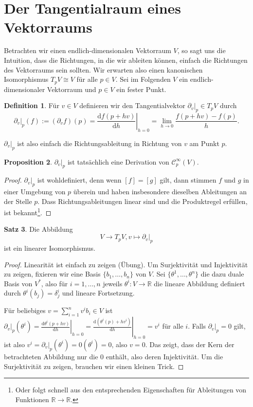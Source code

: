 \documentclass[a4paper]{scrreprt}
\numberwithin{equation}{chapter}
\newcommand{\D}{\mathrm{d}}
\newcommand{\sC}{\mathcal{C}^{\infty}}
\theoremstyle{definition}
\newtheorem{defn}{Definition}[section]
\newtheorem{prop}[defn]{Proposition}
\newtheorem{satz}[defn]{Satz}
\begin{document}
\section{Der Tangentialraum eines Vektorraums}

Betrachten wir einen endlich-dimensionalen Vektorraum $V$, so sagt uns die Intuition, dass die Richtungen, in die wir ableiten können, einfach die Richtungen des Vektorraums sein sollten. Wir erwarten also einen kanonischen Isomorphismus $T_pV \cong V$ für alle $p \in V$. Sei im Folgenden $V$ ein endlich-dimensionaler Vektorraum und $p \in V$ ein fester Punkt.
\begin{defn}
	Für $v \in V$ definieren wir den Tangentialvektor $\left.\partial_v\right|_p \in T_pV$ durch
	\[\left.\partial_v\right|_p(f) := (\partial_v f)(p) = \left.\frac{\D f(p + h v)}{\D h}\right|_{h=0} = \lim_{h\to 0} \frac{f(p + h v) - f(p)}{h}.\]
\end{defn}
$\left.\partial_v\right|_p$ ist also einfach die Richtungsableitung in Richtung von $v$ am Punkt $p$.
\begin{prop}
	$\left.\partial_v\right|_p$ ist tatsächlich eine Derivation von $\sC_p(V)$.
	
	\begin{proof}
		$\left.\partial_v\right|_p$ ist wohldefiniert, denn wenn $[f] = [g]$ gilt, dann stimmen $f$ und $g$ in einer Umgebung von $p$ überein und haben insbesondere dieselben Ableitungen an der Stelle $p$. Dass Richtungsableitungen linear sind und die Produktregel erfüllen, ist bekannt\footnote{Oder folgt schnell aus den entsprechenden Eigenschaften für Ableitungen von Funktionen $\mathbb R \to \mathbb R$.}.
	\end{proof}
\end{prop}

\begin{satz} \label{satz:tangt_vr}
	Die Abbildung \[V \to T_pV, v \mapsto \left.\partial_v\right|_p\] ist ein linearer Isomorphismus.
	
	\begin{proof}\let\qed\relax
		Linearität ist einfach zu zeigen (Übung). Um Surjektivität und Injektivität zu zeigen, fixieren wir eine Basis $\{b_1,\dots,b_n\}$ von $V$. Sei $\{\theta^1, \dots, \theta^n\}$ die dazu duale Basis von $V^*$, also für $i = 1, \dots, n$ jeweils $\theta^i\colon V \to \mathbb R$ die lineare Abbildung definiert durch $\theta^i(b_j) = \delta^i_j$ und lineare Fortsetzung.

		Für beliebiges $v = \sum_{i=1}^n v^i b_i \in V$ ist $\left.\partial_v\right|_p(\theta^i) = \left.\frac{\D\theta^i(p + h v)}{\D h}\right|_{h=0} = \left.\frac{\D(\theta^i(p) + h v^i)}{\D h}\right|_{h=0} = v^i$ für alle $i$. Falls $\left.\partial_v\right|_p = 0$ gilt, ist also $v^i = \left.\partial_v\right|_p(\theta^i) = 0(\theta^i) = 0$, also $v=0$. Das zeigt, dass der Kern der betrachteten Abbildung nur die 0 enthält, also deren Injektivität. Um die Surjektivität zu zeigen, brauchen wir einen kleinen Trick.
	\end{proof}
\end{satz}
\end{document}
